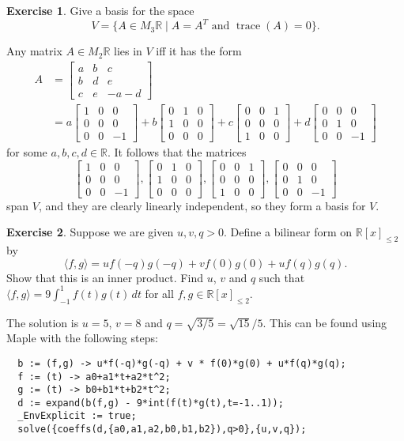 \documentclass[a4paper]{amsart}
\newcommand{\R}         {{\mathbb{R}}}
\newcommand{\bsm}       {\left[\begin{smallmatrix}}
\newcommand{\esm}       {\end{smallmatrix}\right]}
\newcommand{\ip}[1]     {\langle #1\rangle}
\newcommand{\st}        {\;|\;}
\newcommand{\trace}     {\operatorname{trace}}
\renewcommand{\:}{\colon}
\theoremstyle{definition}
\newtheorem{exercise}{Exercise}
\newenvironment{solution}{{\noindent \bf Solution:}}{}
\begin{document}
\begin{exercise}
 Give a basis for the space 
 \[ V = \{A\in M_3\R\st A = A^T \text{ and } \trace(A)=0\}.
 \]
\end{exercise}
\begin{solution}
 Any matrix $A\in M_2\R$ lies in $V$ iff it has the form 
 \begin{align*}
  A &= \bsm a & b & c \\ b & d & e \\ c & e & -a-d \esm \\
    &= a \bsm 1&0&0 \\ 0&0&0 \\ 0&0&-1 \esm + 
       b \bsm 0&1&0 \\ 1&0&0 \\ 0&0&0 \esm +
       c \bsm 0&0&1 \\ 0&0&0 \\ 1&0&0 \esm + 
       d \bsm 0&0&0 \\ 0&1&0 \\ 0&0&-1 \esm
 \end{align*}
 for some $a,b,c,d\in\R$.  It follows that the matrices
 \[    \bsm 1&0&0 \\ 0&0&0 \\ 0&0&-1 \esm,
       \bsm 0&1&0 \\ 1&0&0 \\ 0&0&0 \esm,
       \bsm 0&0&1 \\ 0&0&0 \\ 1&0&0 \esm, 
       \bsm 0&0&0 \\ 0&1&0 \\ 0&0&-1 \esm
 \]
 span $V$, and they are clearly linearly independent, so
 they form a basis for $V$.
\end{solution}


\begin{exercise}
 Suppose we are given $u,v,q>0$.  Define a bilinear form on
 $\R[x]_{\leq 2}$ by
 \[ \ip{f,g} = u f(-q)g(-q) + v f(0)g(0) + u f(q)g(q). \]
 Show that this is an inner product.  Find $u$, $v$ and $q$
 such that $\ip{f,g}=9\int_{-1}^1 f(t)g(t)\,dt$ for all
 $f,g\in\R[x]_{\leq 2}$.
\end{exercise}
\begin{solution}
 The solution is $u=5$, $v=8$ and
 $q=\sqrt{3/5}=\sqrt{15}/5$.  This can be found using Maple
 with the following steps:
 \begin{verbatim}
  b := (f,g) -> u*f(-q)*g(-q) + v * f(0)*g(0) + u*f(q)*g(q);
  f := (t) -> a0+a1*t+a2*t^2;
  g := (t) -> b0+b1*t+b2*t^2;
  d := expand(b(f,g) - 9*int(f(t)*g(t),t=-1..1));
  _EnvExplicit := true;
  solve({coeffs(d,{a0,a1,a2,b0,b1,b2}),q>0},{u,v,q});
 \end{verbatim}
\end{solution}
\end{document}

